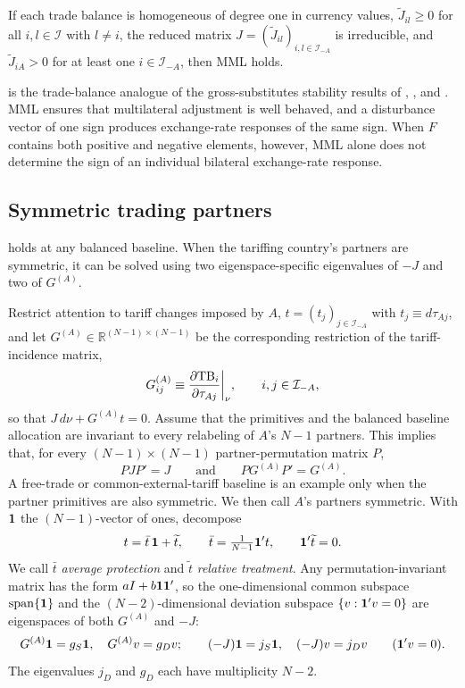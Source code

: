 \begin{lemma}
\label{lem:gs}
If each trade balance is homogeneous of degree one in currency values, $\widetilde J_{il}\geq0$ for all $i,l\in\mathcal I$ with $l\neq i$, the reduced matrix $J=(\widetilde J_{il})_{i,l\in\mathcal I_{-A}}$ is irreducible, and $\widetilde J_{iA}>0$ for at least one $i\in\mathcal I_{-A}$, then MML holds.
\end{lemma}

 is the trade-balance analogue of the gross-substitutes stability results of \citet{hicks1939}, \citet{mosak1944}, \citet{metzler1945} and \citet{arrow1959}. MML ensures that multilateral adjustment is well behaved, and a disturbance vector of one sign produces exchange-rate responses of the same sign. When $F$ contains both positive and negative elements, however, MML alone does not determine the sign of an individual bilateral exchange-rate response.
\subsection{Symmetric trading partners}
\label{sec:decomposition}

 holds at any balanced baseline. When the tariffing country's partners are symmetric, it can be solved using two eigenspace-specific eigenvalues of $-J$ and two of $G^{(A)}$.

Restrict attention to tariff changes imposed by $A$, $t=(t_j)_{j\in\mathcal I_{-A}}$ with $t_j\equiv d\tau_{Aj}$, and let $G^{(A)}\in\mathbb R^{(N-1)\times(N-1)}$ be the corresponding restriction of the tariff-incidence matrix,
\begin{equation*}
G^{(A)}_{ij}\equiv\frac{\partial\mathrm{TB}_i}{\partial\tau_{Aj}}\bigg|_{\nu},\qquad i,j\in\mathcal I_{-A},
\end{equation*}
so that $J\,d\nu+G^{(A)}t=0$. Assume that the primitives and the balanced baseline allocation are invariant to every relabeling of $A$'s $N-1$ partners. This implies that, for every $(N-1)\times(N-1)$ partner-permutation matrix $P$,
\begin{equation*}
PJP'=J\qquad\text{and}\qquad PG^{(A)}P'=G^{(A)}.
\end{equation*}
A free-trade or common-external-tariff baseline is an example only when the partner primitives are also symmetric. We then call $A$'s partners symmetric. With $\mathbf{1}$ the $(N-1)$-vector of ones, decompose
\begin{equation}
t=\bar t\,\mathbf{1}+\widetilde t,\qquad \bar t=\tfrac{1}{N-1}\mathbf{1}'t,\qquad \mathbf{1}'\widetilde t=0.
\label{eq:tsplit}
\end{equation}
We call $\bar t$ \emph{average protection} and $\widetilde t$ \emph{relative treatment}. Any permutation-invariant matrix has the form $aI+b\mathbf{1}\mathbf{1}'$, so the one-dimensional common subspace $\operatorname{span}\{\mathbf{1}\}$ and the $(N-2)$-dimensional deviation subspace $\{v:\mathbf{1}'v=0\}$ are eigenspaces of both $G^{(A)}$ and $-J$:
\begin{equation*}
G^{(A)}\mathbf{1}=g_S\mathbf{1},\quad G^{(A)}v=g_Dv;\qquad (-J)\mathbf{1}=j_S\mathbf{1},\quad (-J)v=j_Dv\qquad(\mathbf{1}'v=0).
\end{equation*}
The eigenvalues $j_D$ and $g_D$ each have multiplicity $N-2$.

